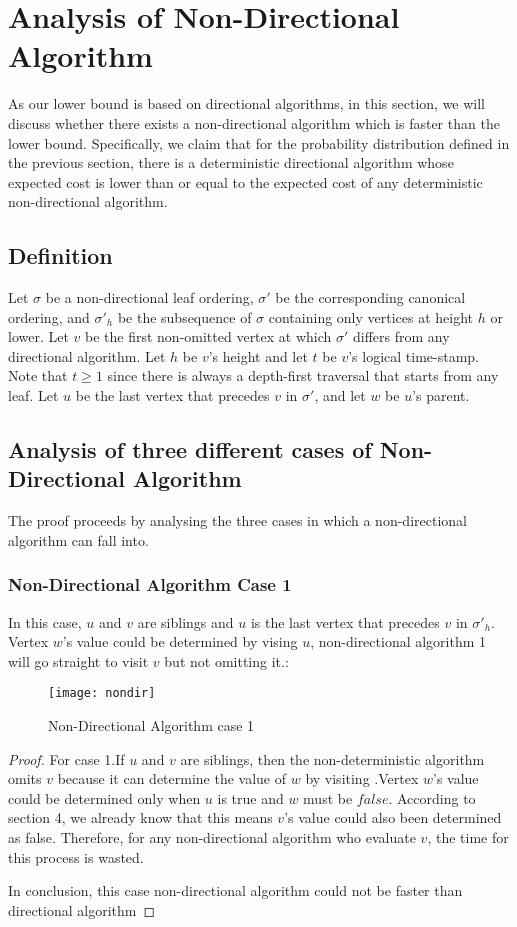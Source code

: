 \chapter{Analysis of Non-Directional Algorithm}
As our lower bound is based on directional algorithms, in this section, 
we will discuss whether there exists a non-directional algorithm 
which is faster than the lower bound.
Specifically, we claim that for the probability distribution defined in the previous section,
there is a deterministic directional algorithm whose expected cost is lower than or
equal to the expected cost of any deterministic non-directional algorithm.

\section{Definition}
Let $\sigma$ be a non-directional leaf ordering,
$\sigma'$ be the corresponding canonical ordering, and
$\sigma'_h$ be the subsequence of $\sigma$ containing only vertices
at height $h$ or lower.
Let $v$ be the first non-omitted vertex
at which $\sigma'$  differs from any directional algorithm.
Let $h$ be $v$'s height and let $t$ be $v$'s logical time-stamp.
Note that $t \geq 1$ since there is always a depth-first traversal
that starts from any leaf.
Let $u$ be the last vertex that precedes $v$ in $\sigma'$, and 
let $w$ be $u$'s parent.

\section{Analysis of three different cases of Non-Directional Algorithm}
The proof proceeds by analysing the three cases in which 
a non-directional algorithm can fall into.
\subsection{Non-Directional Algorithm Case 1}

In this case, $u$ and $v$ are siblings and $u$ is the last vertex that precedes $v$ in $\sigma'_h$. Vertex $w$'s value could be determined by vising $u$, non-directional algorithm 1 will go straight to visit $v$ but not omitting it.:
\begin{figure}[H]
	\centering
	\texttt{[image: nondir]}
	\caption{ Non-Directional Algorithm case 1}
	\label{fig:nondir}
\end{figure}
\begin{proof}
	For case 1.If $u$ and $v$ are siblings, then the non-deterministic algorithm omits $v$ because it can determine the value of $w$ by visiting .Vertex $w$'s value could be determined only when $u$ is true and $w$ must be $false$. According to section 4, we already know that 
	this means $v$'s value could also been determined as false. Therefore, for any non-directional algorithm who evaluate $v$, the time for this process is wasted. 
	
	In conclusion, this case non-directional algorithm could not be faster than directional algorithm
\end{proof}

